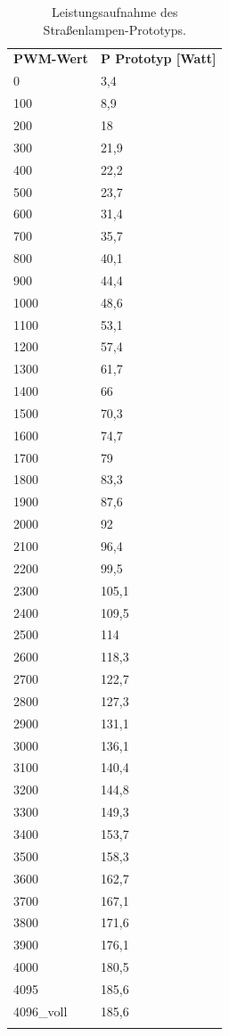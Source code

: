 \documentclass[a4paper,12pt]{scrartcl}
\begin{document}
\begin{longtable}[H]{p{35mm}>{\columncolor[gray]{0.97}}p{35mm}}
  \rowcolor[gray]{.9}
    \textbf{PWM-Wert} & \textbf{P Prototyp [Watt]}\\ 
0	&	3,4	\\
\rowcolor[gray]{.95}
100	&	8,9	\\
200	&	18	\\
\rowcolor[gray]{.95}
300	&	21,9	\\
400	&	22,2	\\
\rowcolor[gray]{.95}
500	&	23,7	\\
600	&	31,4	\\
\rowcolor[gray]{.95}
700	&	35,7	\\
800	&	40,1	\\
\rowcolor[gray]{.95}
900	&	44,4	\\
1000	&	48,6	\\
\rowcolor[gray]{.95}
1100	&	53,1	\\
1200	&	57,4	\\
\rowcolor[gray]{.95}
1300	&	61,7	\\
1400	&	66	\\
\rowcolor[gray]{.95}
1500	&	70,3	\\
1600	&	74,7	\\
\rowcolor[gray]{.95}
1700	&	79	\\
1800	&	83,3	\\
\rowcolor[gray]{.95}
1900	&	87,6	\\
2000	&	92	\\
\rowcolor[gray]{.95}
2100	&	96,4	\\
2200	&	99,5	\\
\rowcolor[gray]{.95}
2300	&	105,1	\\
2400	&	109,5	\\
\rowcolor[gray]{.95}
2500	&	114	\\
2600	&	118,3	\\
\rowcolor[gray]{.95}
2700	&	122,7	\\
2800	&	127,3	\\
\rowcolor[gray]{.95}
2900	&	131,1	\\
3000	&	136,1	\\
\rowcolor[gray]{.95}
3100	&	140,4	\\
3200	&	144,8	\\
\rowcolor[gray]{.95}
3300	&	149,3	\\
3400	&	153,7	\\
\rowcolor[gray]{.95}
3500	&	158,3	\\
3600	&	162,7	\\
\rowcolor[gray]{.95}
3700	&	167,1	\\
3800	&	171,6	\\
\rowcolor[gray]{.95}
3900	&	176,1	\\
4000	&	180,5	\\
\rowcolor[gray]{.95}
4095	&	185,6	\\
4096\_voll	&	185,6	\\
\caption{Leistungsaufnahme des Straßenlampen-Prototyps.}
\label{tab:pprototyp}
\end{longtable}
\end{document}
